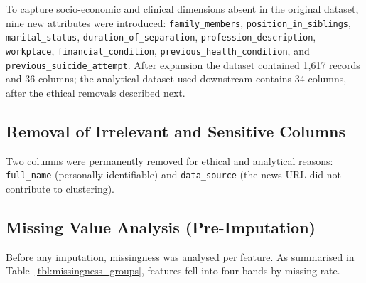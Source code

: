 To capture socio-economic and clinical dimensions absent in the original dataset, nine new attributes were introduced: \texttt{family\_members}, \texttt{position\_in\_siblings}, \texttt{marital\_status}, \texttt{duration\_of\_separation}, \texttt{profession\_description}, \texttt{workplace}, \texttt{financial\_condition}, \texttt{previous\_health\_condition}, and \texttt{previous\_suicide\_attempt}. After expansion the dataset contained 1,617 records and 36 columns; the analytical dataset used downstream contains 34 columns, after the ethical removals described next.

\subsection{Removal of Irrelevant and Sensitive Columns}

Two columns were permanently removed for ethical and analytical reasons: \texttt{full\_name} (personally identifiable) and \texttt{data\_source} (the news URL did not contribute to clustering).

\subsection{Missing Value Analysis (Pre-Imputation)}

Before any imputation, missingness was analysed per feature. As summarised in Table~\ref{tbl:missingness_groups}, features fell into four bands by missing rate.

